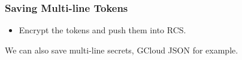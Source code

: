 \begin{frame}
	\frametitle{Saving Multi-line Tokens}
	\begin{itemize}
		\item Encrypt the tokens and push them into RCS.
	\end{itemize}
    \note[item]We can also save multi-line secrets, GCloud JSON for example.
\end{frame}
